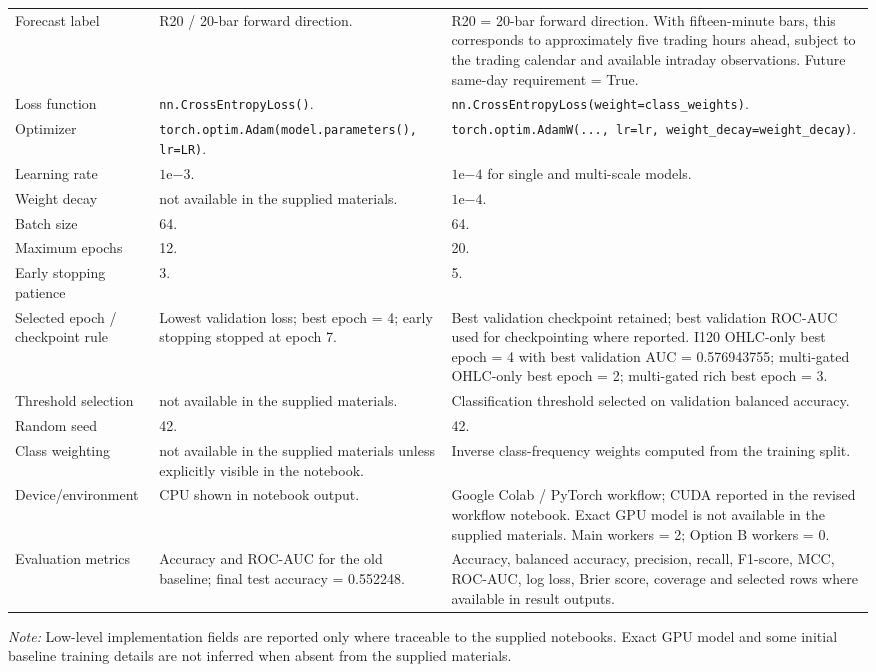 \begin{center}
\begin{tabular}{p{}p{}p{}}
Forecast label & R20 / 20-bar forward direction. & R20 = 20-bar forward direction. With fifteen-minute bars, this corresponds to approximately five trading hours ahead, subject to the trading calendar and available intraday observations. Future same-day requirement = True. \\
Loss function & \texttt{nn.CrossEntropyLoss()}. & \texttt{nn.CrossEntropyLoss(weight=class\_weights)}. \\
Optimizer & \texttt{torch.optim.Adam(model.parameters(), lr=LR)}. & \texttt{torch.optim.AdamW(..., lr=lr, weight\_decay=weight\_decay)}. \\
Learning rate & $1\mathrm{e}{-3}$. & $1\mathrm{e}{-4}$ for single and multi-scale models. \\
Weight decay & not available in the supplied materials. & $1\mathrm{e}{-4}$. \\
Batch size & 64. & 64. \\
Maximum epochs & 12. & 20. \\
Early stopping patience & 3. & 5. \\
Selected epoch / checkpoint rule & Lowest validation loss; best epoch = 4; early stopping stopped at epoch 7. & Best validation checkpoint retained; best validation ROC-AUC used for checkpointing where reported. I120 OHLC-only best epoch = 4 with best validation AUC = 0.576943755; multi-gated OHLC-only best epoch = 2; multi-gated rich best epoch = 3. \\
Threshold selection & not available in the supplied materials. & Classification threshold selected on validation balanced accuracy. \\
Random seed & 42. & 42. \\
Class weighting & not available in the supplied materials unless explicitly visible in the notebook. & Inverse class-frequency weights computed from the training split. \\
Device/environment & CPU shown in notebook output. & Google Colab / PyTorch workflow; CUDA reported in the revised workflow notebook. Exact GPU model is not available in the supplied materials. Main workers = 2; Option B workers = 0. \\
Evaluation metrics & Accuracy and ROC-AUC for the old baseline; final test accuracy = 0.552248. & Accuracy, balanced accuracy, precision, recall, F1-score, MCC, ROC-AUC, log loss, Brier score, coverage and selected rows where available in result outputs. \\
\bottomrule
\end{tabular}
\vspace{2pt}
\parbox{0.96\textwidth}{\footnotesize\emph{Note:} Low-level implementation fields are reported only where traceable to the supplied notebooks. Exact GPU model and some initial baseline training details are not inferred when absent from the supplied materials.}
\end{center}

